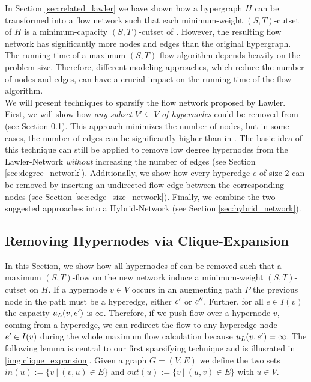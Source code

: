 
In Section \ref{sec:related_lawler} we have shown how a hypergraph $H$ can be transformed into 
a flow network  such that each minimum-weight $(S,T)$-cutset of $H$ is a 
minimum-capacity $(S,T)$-cutset of  \cite{lawler1973}. However, the resulting flow
network has significantly more nodes and edges than the original hypergraph. The running time
of a maximum $(S,T)$-flow algorithm depends heavily on the problem size. 
Therefore, different modeling approaches, which reduce the number of nodes and edges,
can have a crucial impact on the running time of the flow algorithm. \\
We will present techniques to sparsify the flow network 
proposed by Lawler. First, we will show how \emph{any subset} $V' \subseteq V$ \emph{of hypernodes} could be removed 
from  (see Section \ref{sec:heuer_network}). This approach minimizes
the number of nodes, but in some cases, the number of edges can be
significantly higher than in . The basic idea of this technique 
can still be applied to remove low degree hypernodes from the Lawler-Network \emph{without} 
increasing the number of edges (see Section \ref{sec:degree_network}). Additionally, we show
how every hyperedge $e$ of size $2$ can be removed by inserting an undirected flow edge between
the corresponding nodes (see Section \ref{sec:edge_size_network}). 
Finally, we combine the two suggested approaches into a Hybrid-Network 
(see Section \ref{sec:hybrid_network}).



\subsection{Removing Hypernodes via Clique-Expansion}
\label{sec:heuer_network}

In this Section, we show how all hypernodes of  can be removed such that a maximum 
$(S,T)$-flow on the new network induce a minimum-weight $(S,T)$-cutset on $H$. If a hypernode $v \in V$
occurs in an augmenting path $P$ the previous node in the path must be a hyperedge, either
$e'$ or $e''$. Further, for all $e \in I(v)$ the capacity $u_L(v,e')$ is $\infty$. Therefore, 
if we push flow over a hypernode $v$, coming from a hyperedge, we can redirect
the flow to any hyperedge node $e' \in I(v)$ during the whole maximum flow calculation because 
$u_L(v,e') = \infty$. The following lemma is central to our first sparsifying 
technique and is illusrated in \autoref{img:clique_expansion}. Given a graph $G = (V,E)$ we define the two sets
$in(u) := \{v\ |\ (v,u) \in E\}$ and $out(u) := \{v\ |\ (u,v) \in E\}$ with $u \in V$. 

